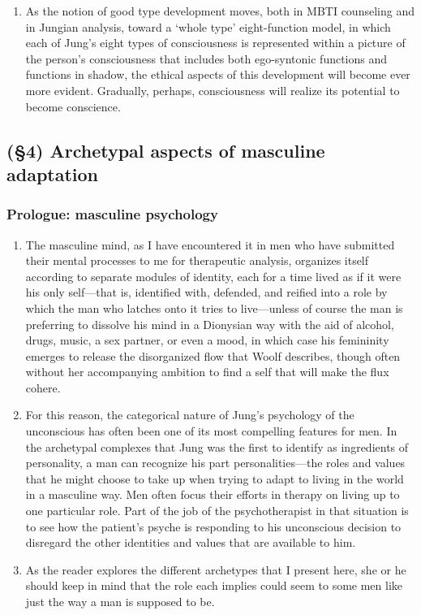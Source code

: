 \begin{enumerate}
    \item {} As the notion of good type
        development moves, both in MBTI counseling and in Jungian analysis,
        toward a ‘whole type’ eight-function model,  in which each of Jung’s
        eight types of consciousness is represented within a picture of the
        person’s consciousness that includes both ego-syntonic functions and
        functions in shadow, the ethical aspects of this development will
        become ever more evident. Gradually, perhaps, consciousness will
        realize its potential to become conscience.

\end{enumerate}


\subsection{(\S4) Archetypal aspects of masculine adaptation}

\subsubsection{Prologue: masculine psychology}

\begin{enumerate}

\item {} The masculine mind, as I have encountered it
in men who have submitted their mental processes to me for therapeutic
analysis, organizes itself according to separate modules of identity, each for
a time lived as if it were his only self—that is, identified with, defended,
and reified into a role by which the man who latches onto it tries to
live—unless of course the man is preferring to dissolve his mind in a Dionysian
way with the aid of alcohol, drugs, music, a sex partner, or even a mood, in
which case his femininity emerges to release the disorganized flow that Woolf
describes, though often without her accompanying ambition to find a self that
will make the flux cohere.

\item {} For this reason, the
categorical nature of Jung's psychology of the unconscious has often been one
of its most compelling features for men. In the archetypal complexes that Jung
was the first to identify as ingredients of personality, a man can recognize
his part personalities—the roles and values that he might choose to take up
when trying to adapt to living in the world in a masculine way. Men often focus
their efforts in therapy on living up to one particular role. Part of the job
of the psychotherapist in that situation is to see how the patient's psyche is
responding to his unconscious decision to disregard the other identities and
values that are available to him.

\item {} As the reader explores the different
archetypes that I present here, she or he should keep in mind that the role
each implies could seem to some men like just the way a man is supposed to be.

\end{enumerate}


